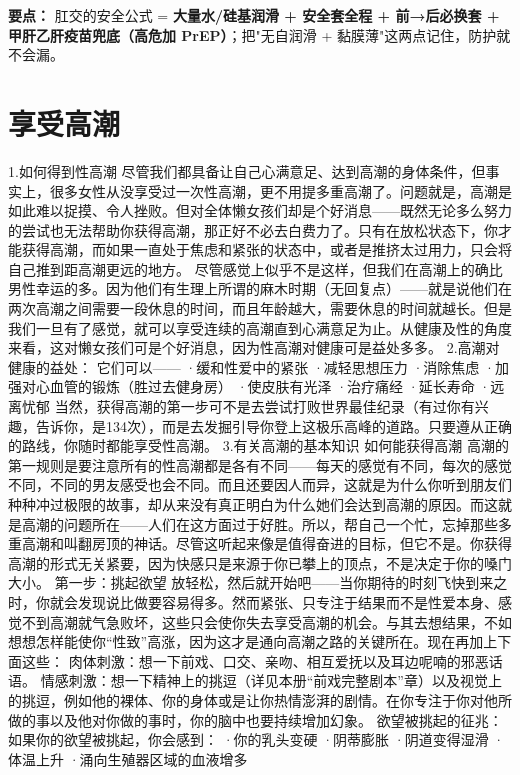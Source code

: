 \documentclass[12pt,UTF8,openany]{ctexbook}
\begin{document}
\vspace{1em}
\noindent\textbf{要点：} 肛交的安全公式 = \textbf{大量水/硅基润滑 + 安全套全程 + 前→后必换套 + 甲肝乙肝疫苗兜底（高危加 PrEP）}；把"无自润滑 + 黏膜薄"这两点记住，防护就不会漏。

\chapter{享受高潮}
1.如何得到性高潮
尽管我们都具备让自己心满意足、达到高潮的身体条件，但事实上，很多女性从没享受过一次性高潮，更不用提多重高潮了。问题就是，高潮是如此难以捉摸、令人挫败。但对全体懒女孩们却是个好消息——既然无论多么努力的尝试也无法帮助你获得高潮，那正好不必去白费力了。只有在放松状态下，你才能获得高潮，而如果一直处于焦虑和紧张的状态中，或者是推挤太过用力，只会将自己推到距高潮更远的地方。
尽管感觉上似乎不是这样，但我们在高潮上的确比男性幸运的多。因为他们有生理上所谓的麻木时期（无回复点）——就是说他们在两次高潮之间需要一段休息的时间，而且年龄越大，需要休息的时间就越长。但是我们一旦有了感觉，就可以享受连续的高潮直到心满意足为止。从健康及性的角度来看，这对懒女孩们可是个好消息，因为性高潮对健康可是益处多多。
2.高潮对健康的益处：
它们可以——
·缓和性爱中的紧张
·减轻思想压力
·消除焦虑
·加强对心血管的锻炼（胜过去健身房）
·使皮肤有光泽
·治疗痛经
·延长寿命
·远离忧郁
当然，获得高潮的第一步可不是去尝试打败世界最佳纪录（有过你有兴趣，告诉你，是134次），而是去发掘引导你登上这极乐高峰的道路。只要遵从正确的路线，你随时都能享受性高潮。
3.有关高潮的基本知识
如何能获得高潮
高潮的第一规则是要注意所有的性高潮都是各有不同——每天的感觉有不同，每次的感觉不同，不同的男友感受也会不同。而且还要因人而异，这就是为什么你听到朋友们种种冲过极限的故事，却从来没有真正明白为什么她们会达到高潮的原因。而这就是高潮的问题所在——人们在这方面过于好胜。所以，帮自己一个忙，忘掉那些多重高潮和叫翻房顶的神话。尽管这听起来像是值得奋进的目标，但它不是。你获得高潮的形式无关紧要，因为快感只是来源于你已攀上的顶点，不是决定于你的嗓门大小。
第一步：挑起欲望
放轻松，然后就开始吧——当你期待的时刻飞快到来之时，你就会发现说比做要容易得多。然而紧张、只专注于结果而不是性爱本身、感觉不到高潮就气急败坏，这些只会使你失去享受高潮的机会。与其去想结果，不如想想怎样能使你“性致”高涨，因为这才是通向高潮之路的关键所在。现在再加上下面这些：
肉体刺激：想一下前戏、口交、亲吻、相互爱抚以及耳边呢喃的邪恶话语。
情感刺激：想一下精神上的挑逗（详见本册“前戏完整剧本”章）以及视觉上的挑逗，例如他的裸体、你的身体或是让你热情澎湃的剧情。在你专注于你对他所做的事以及他对你做的事时，你的脑中也要持续增加幻象。
欲望被挑起的征兆：
如果你的欲望被挑起，你会感到：
·你的乳头变硬
·阴蒂膨胀
·阴道变得湿滑
·体温上升
·涌向生殖器区域的血液增多
\end{document}
